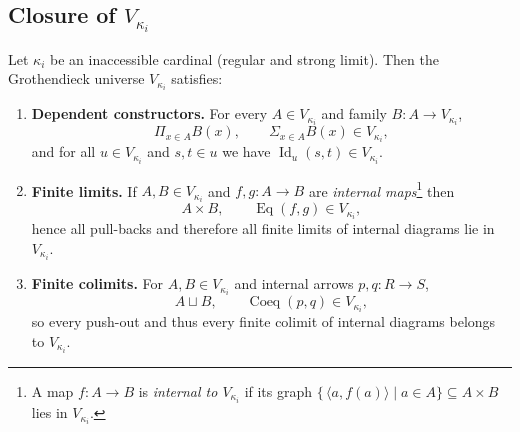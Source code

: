 \documentclass[a4paper,11pt]{article}
\newcommand{\Coeq}{\operatorname{Coeq}}
\newcommand{\Eq}{\operatorname{Eq}}          %
\begin{document}
\subsection{Closure of $V_{\kappa_i}$}
\begin{lemma}\label{lem:set-closure}
Let $\kappa_i$ be an inaccessible cardinal (regular and strong
limit).  Then the Grothendieck universe $V_{\kappa_i}$ satisfies:
\begin{enumerate}[\textbf{(A)}]
  \item \textbf{Dependent constructors.}  
        For every $A\in V_{\kappa_i}$ and family $B:A\to V_{\kappa_i}$,
        \[
          \Pi_{x\in A}B(x),\qquad
          \Sigma_{x\in A}B(x)\in V_{\kappa_i},
        \]
        and for all $u\in V_{\kappa_i}$ and $s,t\in u$ we have
        \(
          \operatorname{Id}_u(s,t)\in V_{\kappa_i}.
        \)
  \item \textbf{Finite limits.}  
        If $A,B\in V_{\kappa_i}$ and $f,g:A\to B$ are
        \emph{internal maps}\footnote{%
          A map $f:A\to B$ is \emph{internal to $V_{\kappa_i}$} if its
          graph $\{\,\langle a,f(a)\rangle\mid a\in A\}\subseteq
          A\times B$ lies in $V_{\kappa_i}$.}
        then
        \[
          A\times B,\qquad
          \Eq(f,g)\in V_{\kappa_i},
        \]
        hence all pull-backs and therefore all finite limits of
        internal diagrams lie in $V_{\kappa_i}$.
  \item \textbf{Finite colimits.}  
        For $A,B\in V_{\kappa_i}$ and internal arrows $p,q:R\to S$,
        \[
          A\sqcup B,\qquad
          \Coeq(p,q)\in V_{\kappa_i},
        \]
        so every push-out and thus every finite colimit of internal
        diagrams belongs to $V_{\kappa_i}$.
\end{enumerate}
\end{lemma}
\end{document}
